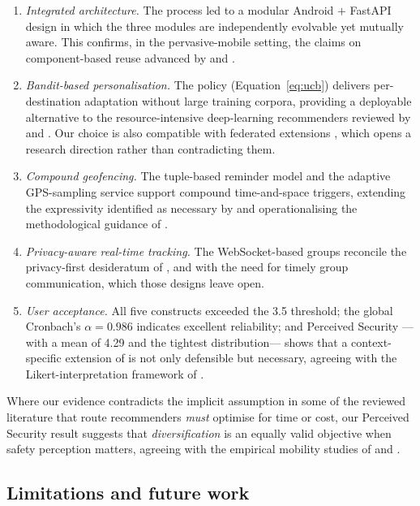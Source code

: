 \documentclass[a4paper,fleqn]{cas-sc}
\begin{document}
	\begin{enumerate}
		\item \emph{Integrated architecture.} The \CBSE{} process led to a modular Android $+$ FastAPI design in which the three modules are independently evolvable yet mutually aware. This confirms, in the pervasive-mobile setting, the claims on component-based reuse advanced by \citet{khan2022cbse} and \citet{coullon2024cbse}.
		\item \emph{Bandit-based personalisation.} The \UCB{} policy (Equation~\ref{eq:ucb}) delivers per-destination adaptation without large training corpora, providing a deployable alternative to the resource-intensive deep-learning recommenders reviewed by \citet{yuan2022mlits} and \citet{liu2022multimodal}. Our choice is also compatible with federated extensions \citep{shi2021fedmab}, which opens a research direction rather than contradicting them.
		\item \emph{Compound geofencing.} The tuple-based reminder model and the adaptive GPS-sampling service support compound time-and-space triggers, extending the expressivity identified as necessary by \citet{wang2015beyond} and operationalising the methodological guidance of \citet{shevchenko2024geofencing}.
		\item \emph{Privacy-aware real-time tracking.} The WebSocket-based groups reconcile the privacy-first desideratum of \citet{li2017locsharing}, \citet{shokri2014mobicrowd} and \citet{mckenzie2022privyto} with the need for timely group communication, which those designs leave open.
		\item \emph{User acceptance.} All five \TAM{} constructs exceeded the 3.5 threshold; the global Cronbach's $\alpha=0.986$ indicates excellent reliability; and Perceived Security ---with a mean of 4.29 and the tightest distribution--- shows that a context-specific extension of \TAM{} is not only defensible but necessary, agreeing with the Likert-interpretation framework of \citet{lindner2024likert}.
	\end{enumerate}
	
	Where our evidence contradicts the implicit assumption in some of the reviewed literature that route recommenders \emph{must} optimise for time or cost, our Perceived Security result suggests that \emph{diversification} is an equally valid objective when safety perception matters, agreeing with the empirical mobility studies of \citet{cagney2025urban} and \citet{liu2022route}.
	
	\subsection{Limitations and future work}\label{sec:future}
	
\end{document}
